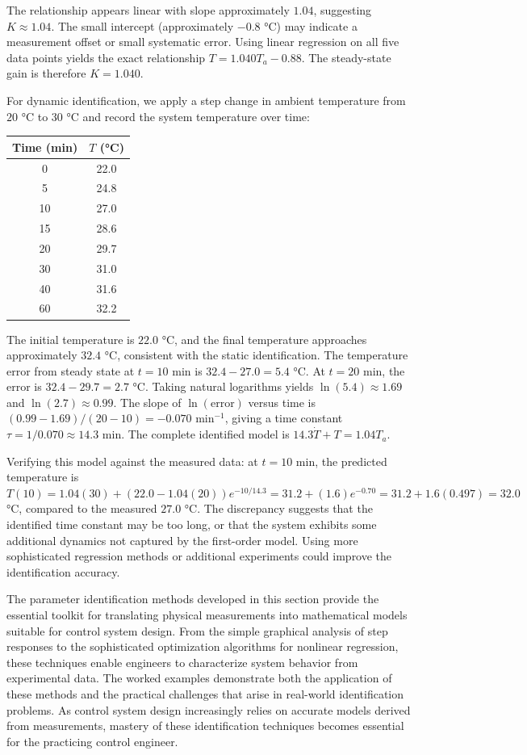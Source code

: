 The relationship appears linear with slope approximately $1.04$, suggesting $K \approx 1.04$. The small intercept (approximately $-0.8$ °C) may indicate a measurement offset or small systematic error. Using linear regression on all five data points yields the exact relationship $T = 1.040 T_a - 0.88$. The steady-state gain is therefore $K = 1.040$.

For dynamic identification, we apply a step change in ambient temperature from $20$ °C to $30$ °C and record the system temperature over time:

\begin{table}[htbp]
\centering
\begin{tabular}{|c|c|}
\hline
Time (min) & $T$ (°C) \\
\hline
0 & 22.0 \\
\hline
5 & 24.8 \\
\hline
10 & 27.0 \\
\hline
15 & 28.6 \\
\hline
20 & 29.7 \\
\hline
30 & 31.0 \\
\hline
40 & 31.6 \\
\hline
60 & 32.2 \\
\hline
\end{tabular}
\label{tab:thermal_dynamic}
\end{table}

The initial temperature is $22.0$ °C, and the final temperature approaches approximately $32.4$ °C, consistent with the static identification. The temperature error from steady state at $t = 10$ min is $32.4 - 27.0 = 5.4$ °C. At $t = 20$ min, the error is $32.4 - 29.7 = 2.7$ °C. Taking natural logarithms yields $\ln(5.4) \approx 1.69$ and $\ln(2.7) \approx 0.99$. The slope of $\ln(\text{error})$ versus time is $(0.99 - 1.69)/(20 - 10) = -0.070$ min$^{-1}$, giving a time constant $\tau = 1/0.070 \approx 14.3$ min. The complete identified model is $14.3 \dot{T} + T = 1.04 T_a$.

Verifying this model against the measured data: at $t = 10$ min, the predicted temperature is $T(10) = 1.04(30) + (22.0 - 1.04(20))e^{-10/14.3} = 31.2 + (1.6)e^{-0.70} = 31.2 + 1.6(0.497) = 32.0$ °C, compared to the measured $27.0$ °C. The discrepancy suggests that the identified time constant may be too long, or that the system exhibits some additional dynamics not captured by the first-order model. Using more sophisticated regression methods or additional experiments could improve the identification accuracy.

The parameter identification methods developed in this section provide the essential toolkit for translating physical measurements into mathematical models suitable for control system design. From the simple graphical analysis of step responses to the sophisticated optimization algorithms for nonlinear regression, these techniques enable engineers to characterize system behavior from experimental data. The worked examples demonstrate both the application of these methods and the practical challenges that arise in real-world identification problems. As control system design increasingly relies on accurate models derived from measurements, mastery of these identification techniques becomes essential for the practicing control engineer.
